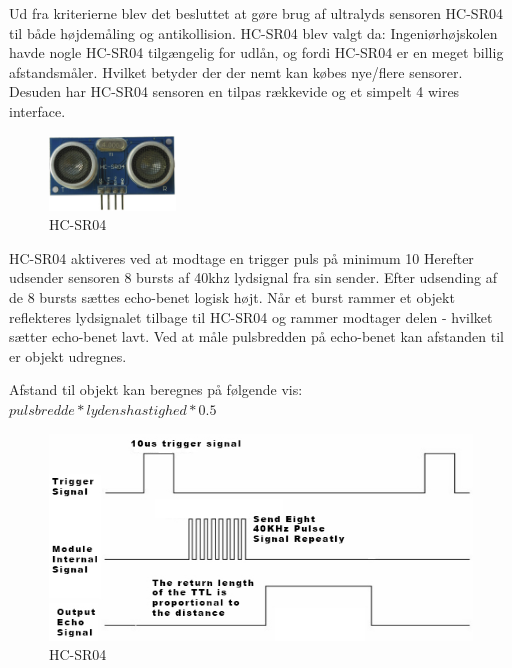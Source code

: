\vspace{0.5cm}

Ud fra kriterierne blev det besluttet at gøre brug af ultralyds sensoren HC-SR04 til både højdemåling og antikollision. HC-SR04 blev valgt da: Ingeniørhøjskolen havde nogle HC-SR04 tilgængelig for udlån, og fordi HC-SR04 er en meget billig afstandsmåler. Hvilket betyder der der nemt kan købes nye/flere sensorer. Desuden har HC-SR04 sensoren en tilpas rækkevide og et simpelt 4 wires interface. 

\begin{figure}[H]
\centering
\includegraphics[width=0.3\textwidth]{Billeder/Afstandsmaler/ultra_sensor.png}
\caption{HC-SR04}
\label{fig:HC-SR04}
\end{figure}

\newpage

HC-SR04 aktiveres ved at modtage en trigger puls på minimum 10 
Herefter udsender sensoren 8 bursts af 40khz lydsignal fra sin sender. Efter udsending af de 8 bursts sættes echo-benet logisk højt. Når et burst rammer et objekt reflekteres lydsignalet tilbage til HC-SR04 og rammer modtager delen - hvilket sætter echo-benet lavt. Ved at måle pulsbredden på echo-benet kan afstanden til er objekt udregnes. 

Afstand til objekt kan beregnes på følgende vis: $pulsbredde * lydenshastighed * 0.5$

\vspace{0.2cm}

\begin{figure}[H]
\centering
\includegraphics[width=1\textwidth]{Billeder/Afstandsmaler/ultra_schematic.png}
\caption{HC-SR04}
\label{fig:HC-SR04}
\end{figure}

\vspace{2cm}








